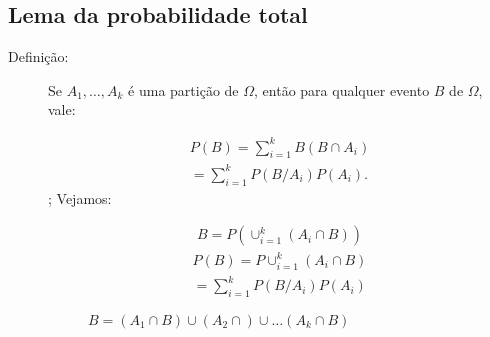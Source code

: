    \subsection{Lema da probabilidade total}
   \begin{description}
     \item [Definição:] Se $A_1,\ldots, A_k$ é uma partição de $\Omega$, então para qualquer evento $B$ de $\Omega$, vale:

       \begin{align}
         P(B)= \sum^k_{i=1} B(B \cap A_i)\\ \nonumber
         = \sum^k_{i=1} P(B/A_i)P(A_i).
       \end{align};
       Vejamos: 

       \begin{align}
         B= P \left(  \cup_{i=1}^k (A_i \cap B) \right)
       \end{align}
       \begin{align}
         P(B)=P \cup_{i=1}^k \left(A_i \cap B\right) \\ \nonumber
           = \sum_{i=1}^k P(B/A_i)P(A_i)
       \end{align}
       \begin{figure}[htpb]
         \centering
         \caption{$B=(A_1 \cap B) \cup (A_2 \cap)\cup \dots (A_k \cap B)$ }
         \label{fig:20}
       \end{figure}
   \end{description}
